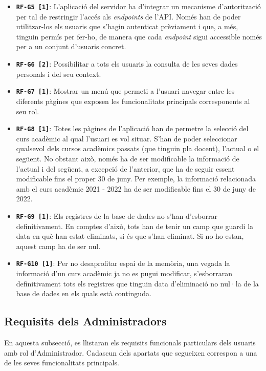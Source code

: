 \documentclass[a4paper,12pt]{ThesisStyle}
\begin{document}
\begin{itemize}
  \item \texttt{\textbf{RF-G5 [1]}}: L'aplicació del servidor ha d'integrar un mecanisme d'autorització per tal de restringir l'accés als \textit{endpoints} de l'API. Només han de poder utilitzar-los els usuaris que s'hagin autenticat prèviament i que, a més, tinguin permís per fer-ho, de manera que cada \textit{endpoint} sigui accessible només per a un conjunt d'usuaris concret.
  \item \texttt{\textbf{RF-G6 [2]}}: Possibilitar a tots els usuaris la consulta de les seves dades personals i del seu context.
  \item \texttt{\textbf{RF-G7 [1]}}: Mostrar un menú que permeti a l'usuari navegar entre les diferents pàgines que exposen les funcionalitats principals corresponents al seu rol.
  \item \texttt{\textbf{RF-G8 [1]}}: Totes les pàgines de l'aplicació han de permetre la selecció del curs acadèmic al qual l'usuari es vol situar. S'han de poder seleccionar qualsevol dels cursos acadèmics passats (que tinguin pla docent), l'actual o el següent. No obstant això, només ha de ser modificable la informació de l'actual i del següent, a excepció de l'anterior, que ha de seguir essent modificable fins el proper 30 de juny. Per exemple, la informació relacionada amb el curs acadèmic 2021 - 2022 ha de ser modificable fins el 30 de juny de 2022.
  \item \texttt{\textbf{RF-G9 [1]}}: Els registres de la base de dades no s'han d'esborrar definitivament. En comptes d'això, tots han de tenir un camp que guardi la data en què han estat eliminats, si és que s'han eliminat. Si no ho estan, aquest camp ha de ser nul.
  \item \texttt{\textbf{RF-G10 [1]}}: Per no desaprofitar espai de la memòria, una vegada la informació d'un curs acadèmic ja no es pugui modificar, s'esborraran definitivament tots els registres que tinguin data d'eliminació no nul·la de la base de dades en els quals està continguda.
\end{itemize}


\subsection{Requisits dels Administradors}
\label{subsec:requisits_administradors}

En aquesta subsecció, es llistaran els requisits funcionals particulars dels usuaris amb rol d'Administrador. Cadascun dels apartats que segueixen correspon a una de les seves funcionalitats principals.
\end{document}
